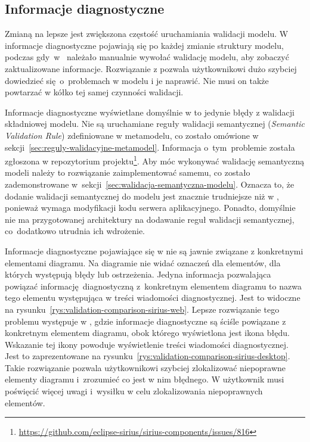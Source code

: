 \subsection{Informacje diagnostyczne}

Zmianą na lepsze jest zwiększona częstość uruchamiania walidacji
modelu. W \SiriusWeb{} informacje diagnostyczne pojawiają się po każdej
zmianie struktury modelu, podczas gdy~w~\SiriusDesktop{} należało
manualnie wywołać walidację modelu, aby zobaczyć zaktualizowane informacje.
Rozwiązanie z \SiriusWeb{} pozwala użytkownikowi dużo szybciej dowiedzieć
się~o~problemach w modelu i je naprawić. Nie musi on także powtarzać w kółko
tej samej czynności walidacji.

Informacje diagnostyczne wyświetlane domyślnie w \SiriusWeb{} to jedynie
błędy z walidacji składniowej modelu. Nie są uruchamiane reguły walidacji
semantycznej (\emph{Semantic Validation Rule}) zdefiniowane w metamodelu, co
zostało omówione w sekcji~\ref{sec:reguly-walidacyjne-metamodel}. Informacja
o~tym~problemie została zgłoszona w repozytorium projektu\footnote{
	\url{https://github.com/eclipse-sirius/sirius-components/issues/816}}.
Aby móc wykonywać walidację semantyczną modeli należy to rozwiązanie
zaimplementować samemu, co zostało zademonstrowane
w~sekcji~\ref{sec:walidacja-semantyczna-modelu}.
Oznacza to, że dodanie walidacji semantycznej do modelu jest znacznie
trudniejsze niż w \SiriusDesktop{}, ponieważ wymaga modyfikacji kodu
serwera aplikacyjnego. Ponadto, domyślnie nie ma przygotowanej architektury na
dodawanie reguł walidacji semantycznej, co~dodatkowo utrudnia ich wdrożenie.

Informacje diagnostyczne pojawiające się w \SiriusWeb{} nie są
jawnie związane z konkretnymi elementami diagramu. Na diagramie nie widać
oznaczeń dla elementów, dla których występują błędy lub ostrzeżenia. Jedyna
informacja pozwalająca powiązać informację diagnostyczną z~konkretnym elementem
diagramu to nazwa tego elementu występująca w treści wiadomości diagnostycznej.
Jest to widoczne na rysunku~\ref{rys:validation-comparison-sirius-web}. Lepsze
rozwiązanie tego problemu występuje w
\SiriusDesktop{}, gdzie informacje diagnostyczne są ściśle powiązane z
konkretnym elementem diagramu, obok którego wyświetlona jest ikona błędu.
Wskazanie tej ikony powoduje wyświetlenie treści wiadomości diagnostycznej.
Jest to zaprezentowane na
rysunku~\ref{rys:validation-comparison-sirius-desktop}.
Takie rozwiązanie pozwala użytkownikowi szybciej zlokalizować niepoprawne
elementy diagramu i~zrozumieć co jest w nim błędnego. W \SiriusWeb{}
użytkownik musi poświęcić więcej uwagi i~wysiłku w celu zlokalizowania
niepoprawnych elementów.

